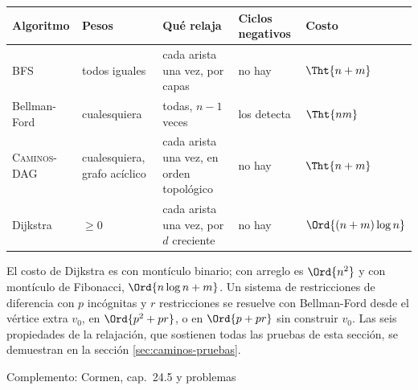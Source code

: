 \documentclass[11pt,letterpaper]{article}
\begin{document}
\begin{center}
\small
\begin{tabular}{l>{\raggedright\arraybackslash}p{2.5cm}%
                 >{\raggedright\arraybackslash}p{3.3cm}%
                 >{\raggedright\arraybackslash}p{2.6cm}l}
  \toprule
  \textbf{Algoritmo} & \textbf{Pesos} & \textbf{Qué relaja}
    & \textbf{Ciclos negativos} & \textbf{Costo} \\
  \midrule
  BFS & todos iguales & cada arista una vez, por capas & no hay
    & $\Tht{n + m}$ \\
  \addlinespace
  Bellman-Ford & cualesquiera & todas, $n - 1$ veces
    & los detecta & $\Tht{nm}$ \\
  \addlinespace
  \textsc{Caminos-DAG} & cualesquiera, grafo acíclico
    & cada arista una vez, en orden topológico & no hay
    & $\Tht{n + m}$ \\
  \addlinespace
  Dijkstra & $\ge 0$ & cada arista una vez, por $d$ creciente
    & no hay & $\Ord{(n + m)\log n}$ \\
  \bottomrule
\end{tabular}
\end{center}

El costo de Dijkstra es con montículo binario; con arreglo es
$\Ord{n^2}$ y con montículo de Fibonacci, $\Ord{n \log n + m}$. Un
sistema de restricciones de diferencia con $p$ incógnitas y $r$
restricciones se resuelve con Bellman-Ford desde el vértice extra
$v_0$, en $\Ord{p^2 + pr}$, o en $\Ord{p + pr}$ sin construir $v_0$.
Las seis propiedades de la relajación, que sostienen todas las
pruebas de esta sección, se demuestran en la sección
\ref{sec:caminos-pruebas}.

\newpage


%
  {Complemento: Cormen, cap.\ 24.5 y problemas}
\label{sec:caminos-pruebas}
\end{document}

